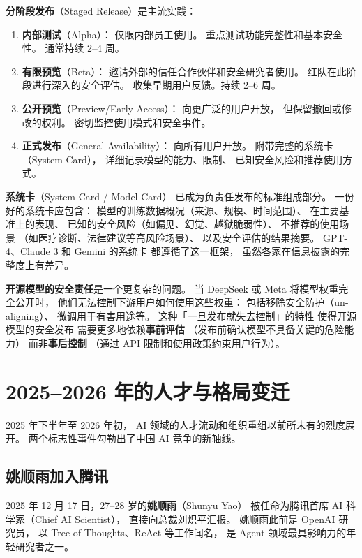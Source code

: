 \textbf{分阶段发布}（Staged Release）是主流实践：
\begin{enumerate}[noitemsep]
  \item \textbf{内部测试}（Alpha）：
        仅限内部员工使用。
        重点测试功能完整性和基本安全性。
        通常持续 2--4 周。
  \item \textbf{有限预览}（Beta）：
        邀请外部的信任合作伙伴和安全研究者使用。
        红队在此阶段进行深入的安全评估。
        收集早期用户反馈。持续 2--6 周。
  \item \textbf{公开预览}（Preview/Early Access）：
        向更广泛的用户开放，
        但保留撤回或修改的权利。
        密切监控使用模式和安全事件。
  \item \textbf{正式发布}（General Availability）：
        向所有用户开放。
        附带完整的系统卡（System Card），
        详细记录模型的能力、限制、
        已知安全风险和推荐使用方式。
\end{enumerate}

\textbf{系统卡}（System Card / Model Card）
已成为负责任发布的标准组成部分。
一份好的系统卡应包含：
模型的训练数据概况（来源、规模、时间范围）、
在主要基准上的表现、
已知的安全风险（如偏见、幻觉、越狱脆弱性）、
不推荐的使用场景
（如医疗诊断、法律建议等高风险场景）、
以及安全评估的结果摘要。
GPT-4、Claude 3 和 Gemini 的系统卡
都遵循了这一框架，
虽然各家在信息披露的完整度上有差异。

\textbf{开源模型的安全责任}是一个更复杂的问题。
当 DeepSeek 或 Meta 将模型权重完全公开时，
他们无法控制下游用户如何使用这些权重：
包括移除安全防护（un-aligning）、
微调用于有害用途等。
这种「一旦发布就失去控制」的特性
使得开源模型的安全发布
需要更多地依赖\textbf{事前评估}
（发布前确认模型不具备关键的危险能力）
而非\textbf{事后控制}
（通过 API 限制和使用政策约束用户行为）。

\section{2025--2026 年的人才与格局变迁}

2025 年下半年至 2026 年初，
AI 领域的人才流动和组织重组以前所未有的烈度展开。
两个标志性事件勾勒出了中国 AI 竞争的新轴线。

\subsection{姚顺雨加入腾讯}

2025 年 12 月 17 日，27--28 岁的\textbf{姚顺雨}（Shunyu Yao）
被任命为腾讯首席 AI 科学家（Chief AI Scientist），
直接向总裁刘炽平汇报。
姚顺雨此前是 OpenAI 研究员，
以 Tree of Thoughts、ReAct 等工作闻名，
是 Agent 领域最具影响力的年轻研究者之一。

